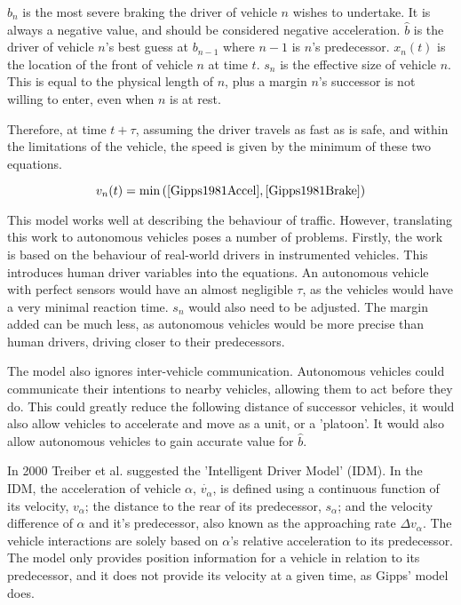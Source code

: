 $b_n$ is the most severe braking the driver of vehicle $n$ wishes to undertake. It is always a negative value, and should be considered negative acceleration. $\hat{b}$ is the driver of vehicle $n$'s best guess at $b_{n-1}$ where $n-1$ is $n$'s predecessor. $x_n(t)$ is the location of the front of vehicle $n$ at time $t$. $s_n$ is the effective size of vehicle $n$. This is equal to the physical length of $n$, plus a margin $n$'s successor is not willing to enter, even when $n$ is at rest.

Therefore, at time $t + \tau$, assuming the driver travels as fast as is safe, and within the limitations of the vehicle, the speed is given by the minimum of these two equations.

\begin{equation}
v_n(t) = \min{(\eqref{Gipps1981Accel},\eqref{Gipps1981Brake})}
\end{equation}

This model works well at describing the behaviour of traffic. However, translating this work to autonomous vehicles poses a number of problems. Firstly, the work is based on the behaviour of real-world drivers in instrumented vehicles. This introduces human driver variables into the equations. An autonomous vehicle with perfect sensors would have an almost negligible $\tau$, as the vehicles would have a very minimal reaction time. $s_n$ would also need to be adjusted. The margin added can be much less, as autonomous vehicles would be more precise than human drivers, driving closer to their predecessors. 

The model also ignores inter-vehicle communication. Autonomous vehicles could communicate their intentions to nearby vehicles, allowing them to act before they do. This could greatly reduce the following distance of successor vehicles, it would also allow vehicles to accelerate and move as a unit, or a 'platoon'. It would also allow autonomous vehicles to gain accurate value for $\hat{b}$.

In 2000 Treiber et al. suggested the 'Intelligent Driver Model' (IDM). In the IDM, the acceleration of vehicle $\alpha$, $\dot{v_\alpha}$, is defined using a continuous function of its velocity, $v_\alpha$; the distance to the rear of its predecessor, $s_\alpha$; and the velocity difference of $\alpha$ and it's predecessor, also known as the approaching rate $\Delta v_\alpha$. The vehicle interactions are solely based on $\alpha$'s relative acceleration to its predecessor. The model only provides position information for a vehicle in relation to its predecessor, and it does not provide its velocity at a given time, as Gipps' model does. 

